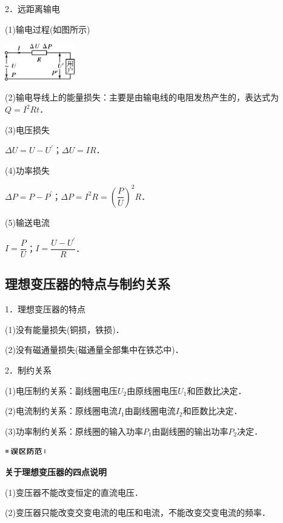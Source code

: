 2．远距离输电

(1)输电过程(如图所示)

\begin{center}\includegraphics[width=1.19792in,height=0.63194in]{media/image450.png}\end{center}

(2)输电导线上的能量损失：主要是由输电线的电阻发热产生的，表达式为$Q=I^2Rt$．

(3)电压损失

$\Delta U=U-U^\prime$；$\Delta U=IR$．

(4)功率损失

$\Delta P=P-P^\prime$；$\Delta P=I^2R=(\dfrac{P}{U})^2R$．

(5)输送电流

$I=\dfrac{P}{U}$；$I=\dfrac{U-U^\prime}{R}$．
\newpage
\subsection{理想变压器的特点与制约关系}

1．理想变压器的特点

(1)没有能量损失(铜损，铁损)．

(2)没有磁通量损失(磁通量全部集中在铁芯中)．

2．制约关系

(1)电压制约关系：副线圈电压$U_2$由原线圈电压$U_1$和匝数比决定．

(2)电流制约关系：原线圈电流$I_1$由副线圈电流$I_2$和匝数比决定．

(3)功率制约关系：原线圈的输入功率$P_1$由副线圈的输出功率$P_2$决定．

\begin{center}\includegraphics[width=0.70764in,height=0.12292in]{media/image34.png}\end{center}
\begin{center}
	\textbf{关于理想变压器的四点说明}
\end{center}

(1)变压器不能改变恒定的直流电压．

(2)变压器只能改变交变电流的电压和电流，不能改变交变电流的频率．

